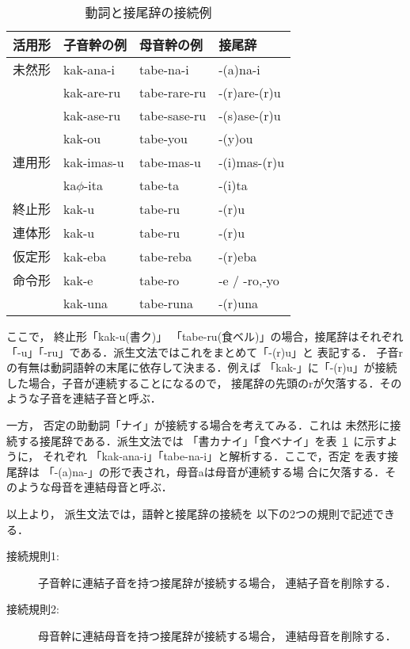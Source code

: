 \begin{table}[tbp]
\caption[接尾辞]{動詞と接尾辞の接続例}
\label{suffix}
  \begin{center}
    \begin{tabular}{l|l|l|l}
	\hline
	\hline
	活用形 & 子音幹の例 & 母音幹の例 & 接尾辞\\
\hline
	未然形	& kak-ana-i & tabe-na-i & -(a)na-i \\
	 	& kak-are-ru & tabe-rare-ru & -(r)are-(r)u \\
		& kak-ase-ru & tabe-sase-ru & -(s)ase-(r)u \\
		& kak-ou     & tabe-you     & -(y)ou \\
	\hline
	連用形	& kak-imas-u & tabe-mas-u & -(i)mas-(r)u \\
		& ka$\phi$-ita & tabe-ta & -(i)ta \\
	\hline
	終止形  & kak-u & tabe-ru & -(r)u \\
	\hline
	連体形  & kak-u & tabe-ru & -(r)u \\
	\hline
	仮定形	& kak-eba & tabe-reba & -(r)eba \\
	\hline
	命令形	& kak-e & tabe-ro & -e / -ro,-yo \\
		& kak-una & tabe-runa & -(r)una \\
	\hline
    \end{tabular}
  \end{center}
\end{table}

ここで，
終止形「kak-u(書ク)」
「tabe-ru(食ベル)」の場合，接尾辞はそれぞれ
「-u」「-ru」である．派生文法ではこれをまとめて「-(r)u」と
表記する．
子音rの有無は動詞語幹の末尾に依存して決まる．例えば
「kak-」に「-(r)u」が接続した場合，子音が連続することになるので，
接尾辞の先頭のrが欠落する．そのような子音を{\dg 連結子音}と呼ぶ．

一方，
否定の助動詞「ナイ」が接続する場合を考えてみる．これは
未然形に接続する接尾辞である．派生文法では
「書カナイ」「食ベナイ」を表~\ref{suffix}~に示すように，
それぞれ
「kak-ana-i」「tabe-na-i」と解析する．ここで，否定
を表す接尾辞は
「-(a)na-」の形で表され，母音aは母音が連続する場
合に欠落する．そのような母音を{\dg 連結母音}と呼ぶ．

以上より，
派生文法では，語幹と接尾辞の接続を
以下の2つの規則で記述できる．
\begin{description}
\item[接続規則1:]
子音幹に連結子音を持つ接尾辞が接続する場合，
連結子音を削除する．
\item[接続規則2:]
母音幹に連結母音を持つ接尾辞が接続する場合，
連結母音を削除する．
\end{description}

